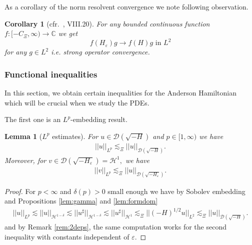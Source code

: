 \documentclass[11pt, oneside]{article}   	%
\newtheorem{corollary}[theorem]{Corollary}
\newtheorem{lemma}[theorem]{Lemma}
\newcommand{\ED}{\mathscr{D} ( \sqrt{-H})}
\newcommand{\ssp}{\mathscr{H}}
\begin{document}



As a corollary of the norm resolvent convergence we note following observation.
	
		\begin{corollary}[cfr.~\cite{reedsimon1}, VIII.20]
			For any bounded continuous function $f:[-C_\Xi,\infty)\to\mathbb{C}$ we get  
			\[ f(H_{\varepsilon}) g \to f(H) g \text{ in }L^2  \]
			for any $g\in L^2$ i.e. strong operator convergence. 
		\end{corollary}

		
	

\subsubsection{Functional inequalities}

In this section, we obtain certain inequalities for the Anderson Hamiltonian which will be crucial when we study the PDEs.

The first one is an $L^p$-embedding result.

\begin{lemma}[$L^p$ estimates]\label{lem:2dlpbounds}
	For $u\in \ED$ and $p\in[1,\infty)$ we have
	\begin{align}
	||u||_{L^p}\lesssim_\Xi ||u||_{\ED}.
	\end{align}
	Moreover, for $v\in \mathscr{D}(\sqrt{ - H_\varepsilon})=\ssp^1,$ we have
	\begin{align}
	||v||_{L^p}\lesssim_\Xi ||u||_{\mathscr{D}(\sqrt{ - H_\varepsilon})}.
	\end{align}
\end{lemma}
\begin{proof}
	For $p<\infty$ and $\delta(p)>0$ small enough we have by Sobolev embedding and Propositions \ref{lem:gamma} and \ref{lem:formdom}
	\begin{align*}
	||u||_{L^p}\lesssim||u||_{\ssp^{1-\delta}}\lesssim||u^\sharp||_{\ssp^{1-\delta}}\lesssim||u^\sharp||_{\ssp^{1}}\lesssim_\Xi||(-H)^{1/2}u||_{L^2}\lesssim_\Xi ||u||_{\ED}.
	\end{align*}
	and by Remark \ref{rem:2deps}, the same computation works for the second inequality with constants independent of $\varepsilon.$
\end{proof}
\end{document}
